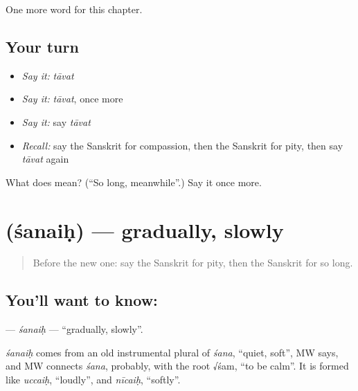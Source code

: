 \begin{grammarlens}[title={What you've built}]
One more word for this chapter.
\end{grammarlens}

\subsection*{Your turn}
\begin{itemize}
\raggedright
  \item \emph{Say it:} \emph{tāvat}
  \item \emph{Say it:} \emph{tāvat}, once more
  \item \emph{Say it:} say \emph{tāvat}
  \item \emph{Recall:} say the Sanskrit for compassion, then the Sanskrit for pity, then say \emph{tāvat} again
\end{itemize}

\begin{tcolorbox}[breakable,colback=teal!4,colframe=teal!35!black,title={Before you move on}]
What does  mean? (\textquotedblleft{}So long, meanwhile\textquotedblright{}.) Say it once more.
\end{tcolorbox}
\section[\texorpdfstring{\sk{शनैः} (śanaiḥ)}{शनैः (śanaiḥ)}]{ (śanaiḥ) — gradually, slowly}

\label{lesson:SA-C240-sanaih}



\begin{quote}
Before the new one: say the Sanskrit for pity, then the Sanskrit for so long.
\end{quote}

\subsection*{You'll want to know: }
\textbf{} — \emph{śanaiḥ} — \textquotedblleft{}gradually, slowly\textquotedblright{}.

\begin{cousinweb}
\emph{śanaiḥ} comes from an old instrumental plural of \emph{śana}, \textquotedblleft{}quiet, soft\textquotedblright{}, MW says, and MW connects \emph{śana}, probably, with the root √śam, \textquotedblleft{}to be calm\textquotedblright{}. It is formed like \emph{uccaiḥ}, \textquotedblleft{}loudly\textquotedblright{}, and \emph{nīcaiḥ}, \textquotedblleft{}softly\textquotedblright{}.
\end{cousinweb}


